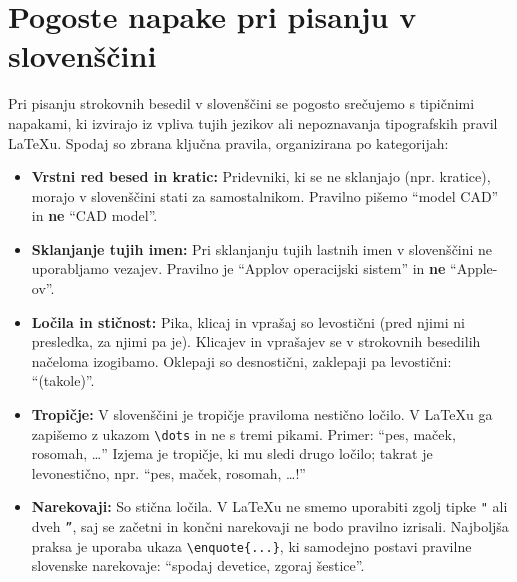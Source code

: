 \documentclass[a4paper,12pt,openright]{book}
\begin{document}
\chapter{Pogoste napake pri pisanju v slovenščini}
\label{ch:slo}

Pri pisanju strokovnih besedil v slovenščini se pogosto srečujemo s tipičnimi napakami, ki izvirajo iz vpliva tujih jezikov ali nepoznavanja tipografskih pravil \LaTeX u. Spodaj so zbrana ključna pravila, organizirana po kategorijah:

\begin{itemize}
    \item \textbf{Vrstni red besed in kratic:} Pridevniki, ki se ne sklanjajo (npr. kratice), morajo v slovenščini stati za samostalnikom. Pravilno pišemo \enquote{model CAD} in \textbf{ne} \enquote{CAD model}.
    
    \item \textbf{Sklanjanje tujih imen:} Pri sklanjanju tujih lastnih imen v slovenščini ne uporabljamo vezajev. Pravilno je \enquote{Applov operacijski sistem} in \textbf{ne} \enquote{Apple-ov}.
    
    \item \textbf{Ločila in stičnost:} Pika, klicaj in vprašaj so levostični (pred njimi ni presledka, za njimi pa je). Klicajev in vprašajev se v strokovnih besedilih načeloma izogibamo. Oklepaji so desnostični, zaklepaji pa levostični: \enquote{(takole)}.
    
    \item \textbf{Tropičje:} V slovenščini je tropičje praviloma nestično ločilo. V \LaTeX u ga zapišemo z ukazom \texttt{\textbackslash dots} in ne s tremi pikami. Primer: \enquote{pes, maček, rosomah, \dots} Izjema je tropičje, ki mu sledi drugo ločilo; takrat je levonestično, npr. \enquote{pes, maček, rosomah, \dots!}
    
    \item \textbf{Narekovaji:} So stična ločila. V \LaTeX u ne smemo uporabiti zgolj tipke \texttt{"} ali dveh \texttt{''}, saj se začetni in končni narekovaji ne bodo pravilno izrisali. Najboljša praksa je uporaba ukaza \texttt{\textbackslash enquote\{...\}}, ki samodejno postavi pravilne slovenske narekovaje: \enquote{spodaj devetice, zgoraj šestice}.
    

\end{itemize}
\end{document}

